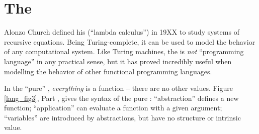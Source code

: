 \documentclass[12pt]{report}
\begin{document}


\section{The \LamA}
\label{lang_sec1}


Alonzo Church defined his \lamA (``lambda calculus'') in 19XX
\citep{ChurchXX} to study systems of recursive equations. Being
Turing-complete, it can be used to model the behavior of any
computational system. Like Turing machines, the \lamA is \emph{not}
``programming language'' in any practical sense, but it has proved
incredibly useful when modelling the behavior of other functional
programming languages.

In the ``pure'' \lamA, \emph{everything} is a function -- there are no
other values. Figure \ref{lang_fig3}, Part , gives the syntax of the pure
\lamA: ``abstraction'' defines a new function; ``application'' can
evaluate a function with a given argument; ``variables'' are
introduced by abstractions, but have no structure or intrinsic value. 
\end{document}
